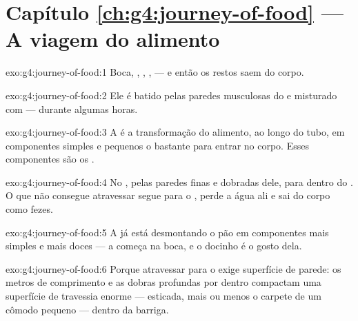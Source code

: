 \section*{Capítulo \ref{ch:g4:journey-of-food} --- A viagem do alimento}

\begin{solution}{exo:g4:journey-of-food:1}
Boca, , , ,  ---
e então os restos saem do corpo.
\end{solution}

\begin{solution}{exo:g4:journey-of-food:2}
Ele é batido pelas paredes musculosas do  e misturado com
 --- durante algumas horas.
\end{solution}

\begin{solution}{exo:g4:journey-of-food:3}
A  é a transformação do alimento, ao longo do tubo, em
componentes simples e pequenos o bastante para entrar no corpo.
Esses componentes são os .
\end{solution}

\begin{solution}{exo:g4:journey-of-food:4}
No , pelas paredes finas e dobradas dele, para
dentro do . O que não consegue atravessar segue para o
, perde a água ali e sai do corpo como fezes.
\end{solution}

\begin{solution}{exo:g4:journey-of-food:5}
A  já está desmontando o pão em componentes mais simples e
mais doces --- a  começa na boca, e o docinho é o gosto
dela.
\end{solution}

\begin{solution}{exo:g4:journey-of-food:6}
Porque atravessar para o  exige superfície de parede: os
metros de comprimento e as dobras profundas por dentro compactam uma
superfície de travessia enorme --- esticada, mais ou menos o carpete
de um cômodo pequeno --- dentro da barriga.
\end{solution}

